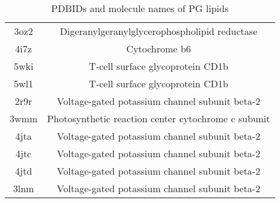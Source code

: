 \documentclass{article}
\begin{document}
\begin{table}[]
\begin{tabular}{c|c}
3oz2 & Digeranylgeranylglycerophospholipid reductase \\ 
4i7z & Cytochrome b6 \\ 
5wki & T-cell surface glycoprotein CD1b \\ 
5wl1 & T-cell surface glycoprotein CD1b \\ 
2r9r & Voltage-gated potassium channel subunit beta-2 \\ 
3wmm & Photosynthetic reaction center cytochrome c subunit \\ 
4jta & Voltage-gated potassium channel subunit beta-2 \\ 
4jtc & Voltage-gated potassium channel subunit beta-2 \\ 
4jtd & Voltage-gated potassium channel subunit beta-2 \\ 
3lnm & Voltage-gated potassium channel subunit beta-2 \\ 
\end{tabular}
    \caption{PDBIDs and molecule names of PG lipids}
    \label{tab:my_label}
\end{table}
\end{document}
